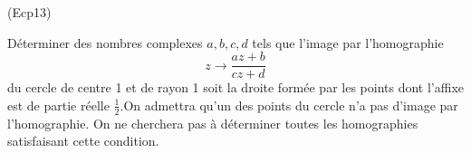 \begin{tiny}(Ecp13)\end{tiny}
Déterminer des nombres complexes $a,b,c,d$ tels que l'image par l'homographie
\begin{displaymath}
z\rightarrow \frac{az+b}{cz+d}  
\end{displaymath}
du cercle de centre 1 et de rayon 1 soit la droite formée par les points dont l'affixe est de partie réelle $\frac{1}{2}$.\newline On admettra qu'un des points du cercle n'a pas d'image par l'homographie. On ne cherchera pas à déterminer toutes les homographies satisfaisant cette condition.
